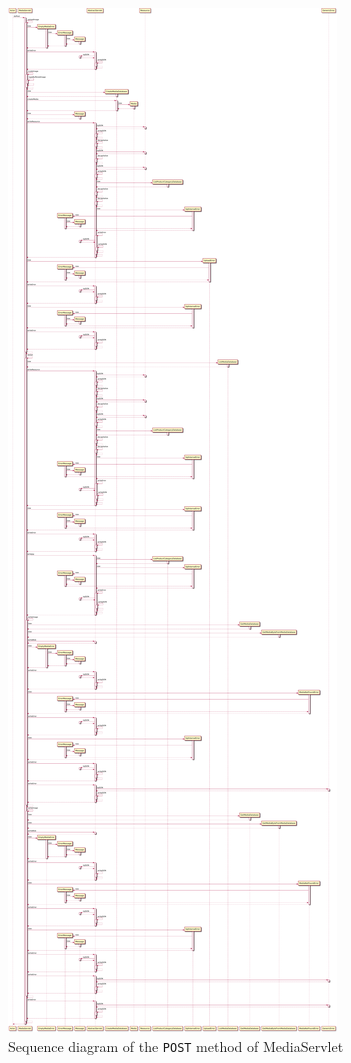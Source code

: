 \begin{figure}[H]
    \centering
    \includegraphics[width=\textwidth,height=0.95\textheight,keepaspectratio]{Schemas/MediaServlet_doPost.svg.pdf}
    \caption{Sequence diagram of the \texttt{POST} method of MediaServlet}
    \label{fig:MediaServlet_doPost}
\end{figure}

